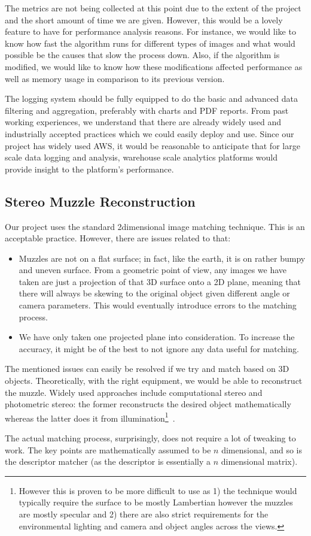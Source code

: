 The metrics are not being collected at this point due to the extent of the project and the short amount of time we are given. However, this would be a lovely feature to have for performance analysis reasons. For instance, we would like to know how fast the algorithm runs for different types of images and what would possible be the causes that slow the process down. Also, if the algorithm is modified, we would like to know how these modifications affected performance as well as memory usage in comparison to its previous version.

The logging system should be fully equipped to do the basic and advanced data filtering and aggregation, preferably with charts and PDF reports. From past working experiences, we understand that there are already widely used and industrially accepted practices which we could easily deploy and use. Since our project has widely used AWS, it would be reasonable to anticipate that for large scale data logging and analysis, warehouse scale analytics platforms would provide insight to the platform's performance.

\subsection{Stereo Muzzle Reconstruction}

Our project uses the standard 2\-dimensional image matching technique. This is an acceptable practice. However, there are issues related to that:

\begin{itemize}
	\item Muzzles are not on a flat surface; in fact, like the earth, it is on rather bumpy and uneven surface. From a geometric point of view, any images we have taken are just a projection of that 3D surface onto a 2D plane, meaning that there will always be skewing to the original object given different angle or camera parameters. This would eventually introduce errors to the matching process.
	\item We have only taken one projected plane into consideration. To increase the accuracy, it might be of the best to not ignore any data useful for matching.
\end{itemize}

The mentioned issues can easily be resolved if we try and match based on 3D objects. Theoretically, with the right equipment, we would be able to reconstruct the muzzle. Widely used approaches include computational stereo and photometric stereo: the former reconstructs the desired object mathematically~\cite{computational_stereo} whereas the latter does it from illumination\footnote{However this is proven to be more difficult to use as 1) the technique would typically require the surface to be mostly Lambertian however the muzzles are mostly specular and 2) there are also strict requirements for the environmental lighting and camera and object angles across the views.}~\cite{photometric_stereo}.

The actual matching process, surprisingly, does not require a lot of tweaking to work. The key points are mathematically assumed to be $n$ dimensional, and so is the descriptor matcher (as the descriptor is essentially a $n$ dimensional matrix).
